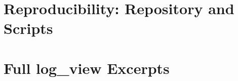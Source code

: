 \chapter{Reproducibility: Repository and Scripts}
\label{app:repo}

\chapter{Full log\_view Excerpts}
\label{app:logs}
